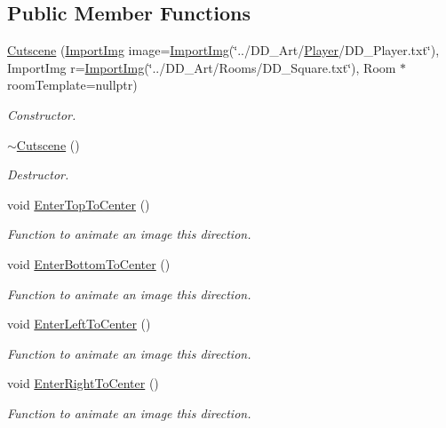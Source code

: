 \subsection*{Public Member Functions}
\begin{DoxyCompactItemize}
\item 
\hyperlink{classCutscene_ae6431d4d2472cfa4c5ba7c22bb1c14e2}{Cutscene} (\hyperlink{classImportImg}{Import\-Img} image=\hyperlink{classImportImg}{Import\-Img}(\char`\"{}../D\-D\-\_\-\-Art/\hyperlink{classPlayer}{Player}/D\-D\-\_\-\-Player.\-txt\char`\"{}), Import\-Img r=\hyperlink{classImportImg}{Import\-Img}(\char`\"{}../D\-D\-\_\-\-Art/Rooms/D\-D\-\_\-\-Square.\-txt\char`\"{}), Room $\ast$room\-Template=nullptr)
\begin{DoxyCompactList}\small\item\em Constructor. \end{DoxyCompactList}\item 
\hyperlink{classCutscene_a87f27f6e952b056528f7974e075e737b}{$\sim$\-Cutscene} ()
\begin{DoxyCompactList}\small\item\em Destructor. \end{DoxyCompactList}\item 
void \hyperlink{classCutscene_afa9eb952cbdf82068a57dc9cf0bf18af}{Enter\-Top\-To\-Center} ()
\begin{DoxyCompactList}\small\item\em Function to animate an image this direction. \end{DoxyCompactList}\item 
void \hyperlink{classCutscene_a169e1c53a82b22a8a38cf652b81fddec}{Enter\-Bottom\-To\-Center} ()
\begin{DoxyCompactList}\small\item\em Function to animate an image this direction. \end{DoxyCompactList}\item 
void \hyperlink{classCutscene_a2475a1d172b3d60e9c6c0d51032a34f7}{Enter\-Left\-To\-Center} ()
\begin{DoxyCompactList}\small\item\em Function to animate an image this direction. \end{DoxyCompactList}\item 
void \hyperlink{classCutscene_a2b8b64265f23d6f8c27a226cd200175d}{Enter\-Right\-To\-Center} ()
\begin{DoxyCompactList}\small\item\em Function to animate an image this direction. \end{DoxyCompactList}\item 

\end{DoxyCompactItemize}

